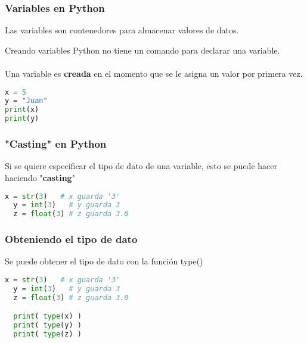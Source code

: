 \begin{frame}[fragile]
  \frametitle{Variables en Python}

  Las variables son contenedores para almacenar valores de datos.

  \begin{block}{Creando variables}
    Python no tiene un comando para declarar una variable. \\~\\
    Una variable es \textbf{creada} en el momento que se le asigna un
    valor por primera vez.
  \end{block}

  \begin{lstlisting}[language=Python]
x = 5
y = "Juan"
print(x)
print(y)
  \end{lstlisting}
\end{frame}

\begin{frame}[fragile]
  \frametitle{"Casting" en Python}

  Si se quiere especificar el tipo de dato de una variable, esto se puede hacer
  haciendo "\textbf{casting}"

  \vspace{\baselineskip}
  \begin{lstlisting}[language=Python]
  x = str(3)   # x guarda '3'
  y = int(3)   # y guarda 3
  z = float(3) # z guarda 3.0
  \end{lstlisting}
\end{frame}

\begin{frame}[fragile]
  \frametitle{Obteniendo el tipo de dato}

  Se puede obtener el tipo de dato con la función
  \textcolor{codeKeyword2}{type}()

  \vspace{\baselineskip}
  \begin{lstlisting}[language=Python]
  x = str(3)   # x guarda '3'
  y = int(3)   # y guarda 3
  z = float(3) # z guarda 3.0

  print( type(x) )
  print( type(y) )
  print( type(z) )
  \end{lstlisting}
\end{frame}

